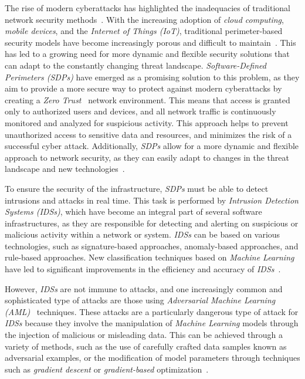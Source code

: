 
The rise of modern cyberattacks has highlighted the inadequacies of traditional network security
methods~\cite{al2021cyber, bubukayr2021cybersecurity}.
With the increasing adoption of \textit{cloud computing}, \textit{mobile devices}, and the
\textit{Internet of Things (IoT)}, traditional perimeter-based security models have become increasingly porous and
difficult to maintain~\cite{karimi2021software, palmo2021complementary}.
This has led to a growing need for more dynamic and flexible security solutions that can adapt to the constantly
changing threat landscape.
\textit{Software-Defined Perimeters (SDPs)} have emerged as a promising solution to this problem, as they aim to
provide a more secure way to protect against modern cyberattacks by creating a \textit{Zero Trust}~\cite{syed2022zero}
network environment.
This means that access is granted only to authorized users and devices, and all network traffic is continuously
monitored and analyzed for suspicious activity.
This approach helps to prevent unauthorized access to sensitive data and resources, and minimizes the risk of a
successful cyber attack.
Additionally, \textit{SDPs} allow for a more dynamic and flexible approach to network security, as they can easily
adapt to changes in the threat landscape and new technologies~\cite{moubayed2019software}.

To ensure the security of the infrastructure, \textit{SDPs} must be able to detect intrusions and attacks in real time.
This task is performed by \textit{Intrusion Detection Systems (IDSs)}, which have become an integral part of
several software infrastructures, as they are responsible for detecting and alerting on suspicious or malicious activity
within a network or system.
\textit{IDSs} can be based on various technologies, such as signature-based approaches, anomaly-based approaches, and
rule-based approaches.
New classification techniques based on \textit{Machine Learning} have led to significant improvements in the efficiency
and accuracy of \textit{IDSs}~\cite{khraisat2019survey}.

However, \textit{IDSs} are not immune to attacks, and one increasingly common and sophisticated type of attacks are
those using \textit{Adversarial Machine Learning (AML)}~\cite{huang2011adversarial} techniques.
These attacks are a particularly dangerous type of attack for \textit{IDSs} because they involve the manipulation of
\textit{Machine Learning} models through the injection of malicious or misleading data.
This can be achieved through a variety of methods, such as the use of carefully crafted data samples known as
adversarial examples, or the modification of model parameters through techniques such as \textit{gradient descent} or
\textit{gradient-based} optimization~\cite{chen2017distributed}.


